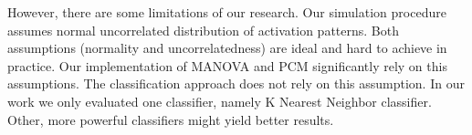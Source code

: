 \documentclass[paper=a4,fontsize=12pt]{scrartcl}
\numberwithin{equation}{section} %
\numberwithin{figure}{section} %
\numberwithin{table}{section} %
\begin{document}
However, there are some limitations of our research. Our simulation procedure assumes normal uncorrelated distribution of activation patterns. Both assumptions (normality and uncorrelatedness) are ideal and hard to achieve in practice. Our implementation of MANOVA and PCM significantly rely on this assumptions. The classification approach does not rely on this assumption. In our work we only evaluated one classifier, namely K Nearest Neighbor classifier. Other, more powerful classifiers might yield better results.

\FloatBarrier



\end{document}
